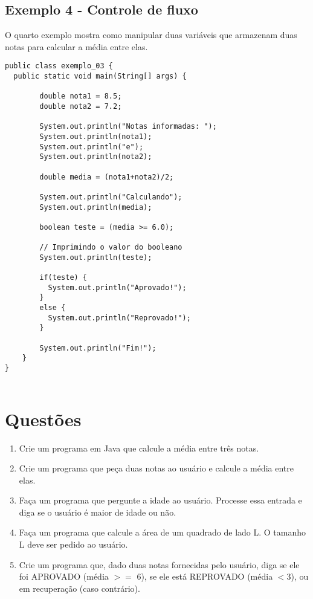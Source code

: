 \documentclass[12pt]{article}
\begin{document}
\subsection{Exemplo 4 - Controle de fluxo}

O quarto exemplo  mostra como manipular duas variáveis que armazenam duas notas para calcular a média entre elas.

\begin{lstlisting}
public class exemplo_03 {
  public static void main(String[] args) {
        
        double nota1 = 8.5;
        double nota2 = 7.2;

        System.out.println("Notas informadas: ");
        System.out.println(nota1);
        System.out.println("e");
        System.out.println(nota2);         
               
        double media = (nota1+nota2)/2;

        System.out.println("Calculando");
        System.out.println(media);              
        
        boolean teste = (media >= 6.0);
        
        // Imprimindo o valor do booleano
        System.out.println(teste);
        
        if(teste) {
          System.out.println("Aprovado!");
        }
        else {
          System.out.println("Reprovado!");
        }
        
        System.out.println("Fim!");
    }
}


\end{lstlisting}



\section{Questões}

\begin{enumerate}
  \item Crie um programa em Java que calcule a média entre três notas.
  \item Crie um programa que peça duas notas ao usuário e calcule a média entre elas.
  \item Faça um programa que pergunte a idade ao usuário. Processe essa entrada e diga se o usuário é maior de idade ou não.
  \item Faça um programa que calcule a área de um quadrado de lado L. O tamanho L deve ser pedido ao usuário.
  \item Crie um programa que, dado duas notas fornecidas pelo usuário, diga se ele foi APROVADO (média $>=$ 6), se ele está REPROVADO (média $<3$), ou em recuperação (caso contrário).
\end{enumerate}




\end{document}
